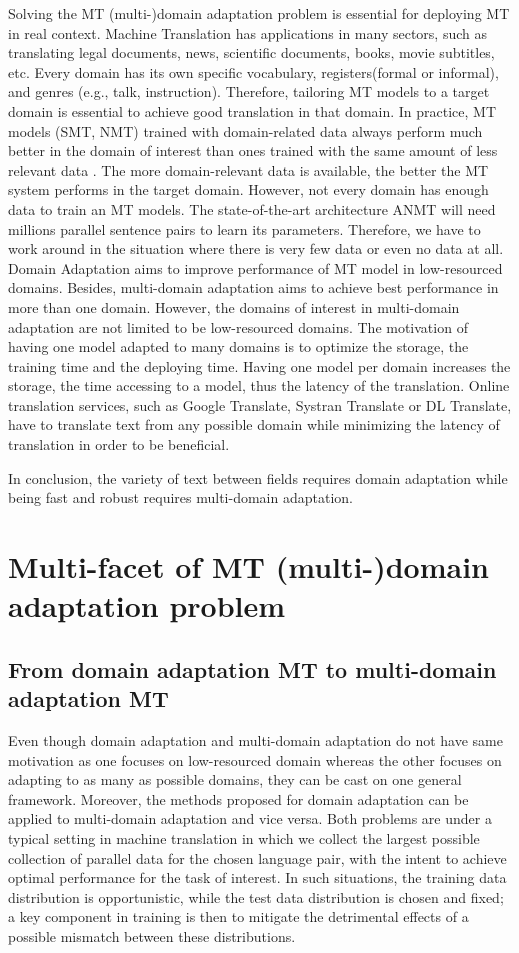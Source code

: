 Solving the MT (multi-)domain adaptation problem is essential for deploying MT in real context. Machine Translation has applications in many sectors, such as translating legal documents, news, scientific documents, books, movie subtitles, etc. Every domain has its own specific vocabulary, registers(formal or informal), and genres (e.g., talk, instruction). Therefore, tailoring MT models to a target domain is essential to achieve good translation in that domain. In practice, MT models (SMT, NMT) trained with domain-related data always perform much better in the domain of interest than ones trained with the same amount of less relevant data \citep{Rico13domain, Saunders21domain}. The more domain-relevant data is available, the better the MT system performs in the target domain. However, not every domain has enough data to train an MT models. The state-of-the-art architecture ANMT will need millions parallel sentence pairs to learn its parameters. Therefore, we have to work around in the situation where there is very few data or even no data at all. Domain Adaptation aims to improve performance of MT model in low-resourced domains. Besides, multi-domain adaptation aims to achieve best performance in more than one domain. However, the domains of interest in multi-domain adaptation are not limited to be low-resourced domains. The motivation of having one model adapted to many domains is to optimize the storage, the training time and the deploying time. Having one model per domain increases the storage, the time accessing to a model, thus the latency of the translation. Online translation services, such as Google Translate, Systran Translate or DL Translate, have to translate text from any possible domain while minimizing the latency of translation in order to be beneficial.

In conclusion, the variety of text between fields requires domain adaptation while being fast and robust requires multi-domain adaptation.

\section{Multi-facet of MT (multi-)domain adaptation problem}
\label{sec:multi-facet}
\subsection{From domain adaptation MT to multi-domain adaptation MT}
Even though domain adaptation and multi-domain adaptation do not have same motivation as one focuses on low-resourced domain whereas the other focuses on adapting to as many as possible domains, they can be cast on one general framework. Moreover, the methods proposed for domain adaptation can be applied to multi-domain adaptation and vice versa. Both problems are under a typical setting in machine translation in which we collect the largest possible collection of parallel data for the chosen language pair, with the intent to achieve optimal performance for the task of interest. In such situations, the training data distribution is opportunistic, while the test data distribution is chosen and fixed; a key component in training is then to mitigate the detrimental effects of a possible mismatch between these distributions. 

